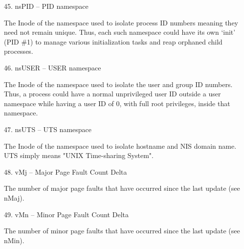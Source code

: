 45. nsPID  --  PID namespace    \par
The Inode of the namespace used to isolate process ID numbers meaning they need not remain unique.  Thus, each such namespace could have its own `init' (PID \#1) to manage various initialization tasks and reap orphaned child processes.

46. nsUSER  --  USER namespace  \par
The Inode of the namespace used to isolate the user and group ID numbers.  Thus, a process could have a normal unprivileged user ID outside a user namespace while having a user ID of 0, with full root privileges, inside that namespace.

47. nsUTS  --  UTS namespace    \par
The Inode of the namespace used to isolate hostname and NIS domain name.  UTS simply means "UNIX Time-sharing System".

48. vMj  --  Major Page Fault Count Delta   \par
The number of major page faults that have occurred since the last update (see nMaj).

49. vMn  --  Minor Page Fault Count Delta   \par
The number of minor page faults that have occurred since the last update (see nMin).








